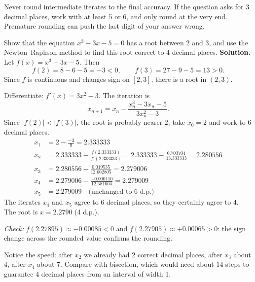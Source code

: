 \documentclass[11pt]{article}
\newcounter{popsec}
\newcounter{popsub}
\newcommand{\courssub}[1]{%
  \stepcounter{popsub}%
  \par\vspace{9pt}\noindent{\popxbold\fontsize{11.5}{13}\selectfont\color{popink}{\color{poporange}\thepopsec.\thepopsub}\hspace{6pt}#1}\par\nopagebreak\vspace{4pt}
}
\begin{document}
\begin{attention}
Never round intermediate iterates to the final accuracy. If the question asks for 3 decimal places, work with at least 5 or 6, and only round at the very end. Premature rounding can push the last digit of your answer wrong.
\end{attention}

\courssub{Worked examples}

\begin{exoresolu}
Show that the equation $x^3 - 3x - 5 = 0$ has a root between $2$ and $3$, and use the Newton--Raphson method to find this root correct to $4$ decimal places.
\tcblower
\textbf{Solution.} Let $f(x) = x^3 - 3x - 5$. Then
\[ f(2) = 8 - 6 - 5 = -3 < 0, \qquad f(3) = 27 - 9 - 5 = 13 > 0. \]
Since $f$ is continuous and changes sign on $[2,3]$, there is a root in $(2,3)$.

Differentiate: $f'(x) = 3x^2 - 3$. The iteration is
\[ x_{n+1} = x_n - \frac{x_n^3 - 3x_n - 5}{3x_n^2 - 3}. \]
Since $|f(2)| < |f(3)|$, the root is probably nearer $2$; take $x_0 = 2$ and work to $6$ decimal places.
\begin{align*}
x_1 &= 2 - \frac{-3}{9} = 2.333333 \\
x_2 &= 2.333333 - \frac{f(2.333333)}{f'(2.333333)} = 2.333333 - \frac{0.703704}{13.333333} = 2.280556 \\
x_3 &= 2.280556 - \frac{0.019535}{12.602805} = 2.279006 \\
x_4 &= 2.279006 - \frac{-0.000110}{12.581604} = 2.279009 \\
x_5 &= 2.279009 \quad \text{(unchanged to 6 d.p.)}
\end{align*}
The iterates $x_4$ and $x_5$ agree to $6$ decimal places, so they certainly agree to $4$. The root is $\boxed{x = 2.2790}$ (4 d.p.).

\emph{Check:} $f(2.27895) \approx -0.00085 < 0$ and $f(2.27905) \approx +0.00065 > 0$: the sign change across the rounded value confirms the rounding.
\end{exoresolu}

Notice the speed: after $x_2$ we already had 2 correct decimal places, after $x_3$ about 4, after $x_4$ about 7. Compare with bisection, which would need about $14$ steps to guarantee 4 decimal places from an interval of width 1.
\end{document}
